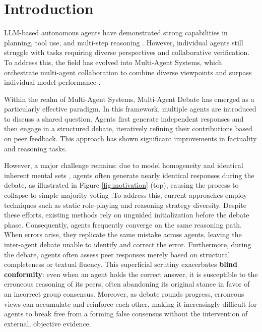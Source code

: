 \section{Introduction}
\label{sec:intro}

LLM-based autonomous agents have demonstrated strong capabilities in planning, tool use, and multi-step reasoning \cite{yao2022react,wang2023voyager,shen2023hugginggpt}. However, individual agents still struggle with tasks requiring diverse perspectives and collaborative verification. To address this, the field has evolved into Multi-Agent Systems, which orchestrate multi-agent collaboration to combine diverse viewpoints and surpass individual model performance \cite{park2023generative,li2024survey}.


Within the realm of Multi-Agent Systems, Multi-Agent Debate \cite{liang2023encouraging,du2023improving,chan2023chateval} has emerged as a particularly effective paradigm. In this framework, multiple agents are introduced to discuss a shared question. Agents first generate independent responses and then engage in a structured debate, iteratively refining their contributions based on peer feedback. This approach has shown significant improvements in factuality and reasoning tasks.

However, a major challenge remains: due to model homogeneity and identical inherent mental sets \cite{liu2025breaking,zhang2025if,smit2023should}, agents often generate nearly identical responses during the debate, as illustrated in Figure \ref{fig:motivation} (top), causing the process to collapse to simple majority voting \cite{choi2025debate}.To address this, current approaches employ techniques such as static role-playing and reasoning strategy diversity. Despite these efforts, existing methods rely on unguided initialization before the debate phase. Consequently, agents frequently converge on the same reasoning path. When errors arise, they replicate the same mistake across agents, leaving the inter-agent debate unable to identify and correct the error. Furthermore, during the debate, agents often assess peer responses merely based on structural completeness or textual fluency. This superficial scrutiny exacerbates \textbf{blind conformity}: even when an agent holds the correct answer, it is susceptible to the erroneous reasoning of its peers, often abandoning its original stance in favor of an incorrect group consensus. Moreover, as debate rounds progress, erroneous views can accumulate and reinforce each other, making it increasingly difficult for agents to break free from a forming false consensus without the intervention of external, objective evidence.

